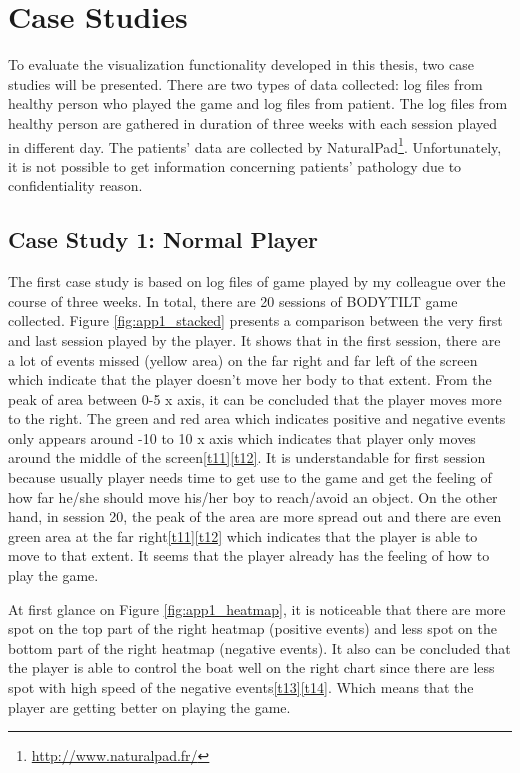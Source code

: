 \chapter{Case Studies}
To evaluate the visualization functionality developed in this thesis, two case studies will be presented. There are two types of data collected: log files from healthy person who played the game and log files from patient. The log files from healthy person are gathered in duration of three weeks with each session played in different day. The patients' data are collected by NaturalPad\footnote{\url{http://www.naturalpad.fr/}}. Unfortunately, it is not possible to get information concerning patients' pathology due to confidentiality reason. 

\section{Case Study 1: Normal Player}
The first case study is based on log files of game played by my colleague over the course of three weeks. In total, there are 20 sessions of BODYTILT game collected. Figure \ref{fig:app1_stacked} presents a comparison between the very first and last session played by the player. It shows that in the first session, there are a lot of events missed (yellow area) on the far right and far left of the screen which indicate that the player doesn't move her body to that extent. From the peak of area between 0-5 x axis, it can be concluded that the player moves more to the right. The green and red area which indicates positive and negative events only appears around -10 to 10 x axis which indicates that player only moves around the middle of the screen\ref{t11}\ref{t12}. It is understandable for first session because usually player needs time to get use to the game and get the feeling of how far he/she should move his/her boy to reach/avoid an object. On the other hand, in session 20, the peak of the area are more spread out and there are even green area at the far right\ref{t11}\ref{t12} which indicates that the player is able to move to that extent. It seems that the player already has the feeling of how to play the game.

At first glance on Figure \ref{fig:app1_heatmap}, it is noticeable that there are more spot on the top part of the right heatmap (positive events) and less spot on the bottom part of the right heatmap (negative events). It also can be concluded that the player is able to control the boat well on the right chart since there are less spot with high speed of the negative events\ref{t13}\ref{t14}. Which means that the player are getting better on playing the game. 

